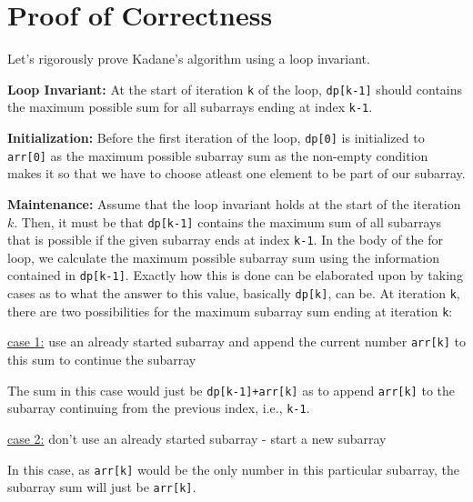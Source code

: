 
\section{Proof of Correctness}

\noindent Let's rigorously prove Kadane's algorithm using a loop invariant. \newline 

\noindent \textbf{Loop Invariant:} At the start of iteration \texttt{k} of the loop, \texttt{dp[k-1]} should contains the maximum possible sum for all subarrays ending at index \texttt{k-1}. \newline

\noindent \textbf{Initialization:} Before the first iteration of the loop, \texttt{dp[0]} is initialized to \texttt{arr[0]} as the maximum possible subarray sum as the non-empty condition makes it so that we have to choose atleast one element to be part of our subarray. \newline

\noindent \textbf{Maintenance:} Assume that the loop invariant holds at the start of the iteration $k$. Then, it must be that \texttt{dp[k-1]} contains the maximum sum of all subarrays that is possible if the given subarray ends at index \texttt{k-1}. In the body of the for loop, we calculate the maximum possible subarray sum using the information contained in \texttt{dp[k-1]}. Exactly how this is done can be elaborated upon by taking cases as to what the answer to this value, basically \texttt{dp[k]}, can be. At iteration \texttt{k}, there are two possibilities for the maximum subarray sum ending at iteration \texttt{k}: \newline 

\noindent \underline{case 1:} use an already started subarray and append the current number \texttt{arr[k]} to this sum to continue the subarray \newline 

\noindent The sum in this case would just be \texttt{dp[k-1]+arr[k]} as to append \texttt{arr[k]} to the subarray continuing from the previous index, i.e., \texttt{k-1}.

\noindent \newline \underline{case 2:} don't use an already started subarray - start a new subarray \newline

\noindent In this case, as \texttt{arr[k]} would be the only number in this particular subarray, the subarray sum will just be \texttt{arr[k]}. \newline

